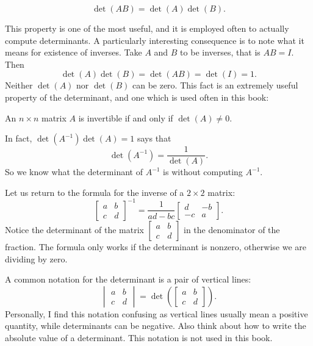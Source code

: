\begin{theorem}
\begin{equation*}
\det(AB) = \det(A)\det(B) .
\end{equation*}
\end{theorem}

This property is one of the most useful, and it is employed often to 
actually compute determinants.  A particularly interesting consequence is to
note what it means for existence of inverses.
Take $A$ and $B$ to be inverses, that is $AB=I$.  Then
\begin{equation*}
\det(A)\det(B) = \det(AB) = \det(I) = 1 .
\end{equation*}
Neither $\det(A)$ nor $\det(B)$ can be zero.
This fact is an extremely useful property of the determinant, and one
which is used often in this book:

\begin{theorem}
An $n \times n$ matrix $A$ is invertible if and only if $\det (A) \not= 0$.
\end{theorem}

In fact, $\det(A^{-1}) \det(A) = 1$ says that
\begin{equation*}
\det(A^{-1}) =
\frac{1}{\det(A)}.
\end{equation*}
So we know what the determinant of $A^{-1}$ is
without computing $A^{-1}$.

Let us return to the formula for the inverse of a $2 \times 2$ matrix:
\begin{equation*}
\begin{bmatrix}
a & b \\
c & d
\end{bmatrix}^{-1}
=
\frac{1}{ad-bc}
\begin{bmatrix}
d & -b \\
-c & a
\end{bmatrix} .
\end{equation*}
Notice the determinant of the matrix
$[\begin{smallmatrix}a&b\\c&d\end{smallmatrix}]$
in the denominator of the fraction.
The formula only works if the determinant is nonzero, otherwise we are
dividing by zero.

%

\medskip


A common notation for the determinant is a pair of vertical
lines:
\begin{equation*}
\begin{vmatrix}
a & b \\
c & d
\end{vmatrix}
=
\det \left(
\begin{bmatrix}
a & b \\
c & d
\end{bmatrix}
\right) .
\end{equation*}
Personally, I find this notation confusing as vertical lines usually
mean a positive quantity, while determinants can be negative.  Also
think about how to write the absolute value of a determinant.
This notation is not used in this book.

